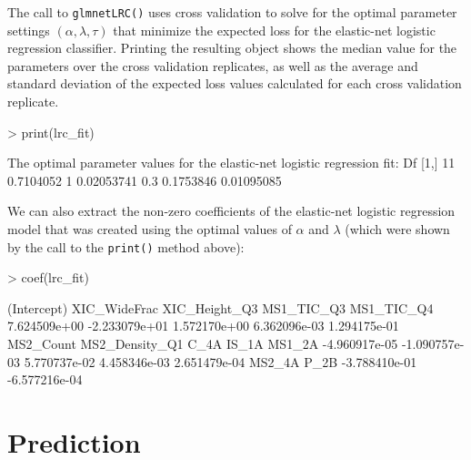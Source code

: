 \documentclass{article}
\begin{document}
\noindent The call to {\tt glmnetLRC()} uses cross validation to solve for the optimal parameter settings 
$\left(\alpha, \lambda, \tau\right)$ that minimize the expected loss for the elastic-net logistic regression 
classifier. Printing the resulting object shows the median value for the parameters over the cross validation 
replicates, as well as the average and standard deviation of the expected loss values calculated for each
cross validation replicate.
 
\begin{Schunk}
\begin{Sinput}
> print(lrc_fit)
\end{Sinput}
\begin{Soutput}
The optimal parameter values for the elastic-net logistic regression fit: 
     Df      %
[1,] 11 0.7104052     1 0.02053741 0.3         0.1753846      0.01095085
\end{Soutput}
\end{Schunk}

\noindent We can also extract the non-zero coefficients of the elastic-net logistic regression 
model that was created using the optimal values of $\alpha$ and $\lambda$ (which were shown by 
the call to the {\tt print()} method above):
\begin{Schunk}
\begin{Sinput}
> coef(lrc_fit)
\end{Sinput}
\begin{Soutput}
   (Intercept)   XIC_WideFrac  XIC_Height_Q3     MS1_TIC_Q3     MS1_TIC_Q4 
  7.624509e+00  -2.233079e+01   1.572170e+00   6.362096e-03   1.294175e-01 
     MS2_Count MS2_Density_Q1           C_4A          IS_1A         MS1_2A 
 -4.960917e-05  -1.090757e-03   5.770737e-02   4.458346e-03   2.651479e-04 
        MS2_4A           P_2B 
 -3.788410e-01  -6.577216e-04 
\end{Soutput}
\end{Schunk}

\section{Prediction}
\end{document}
